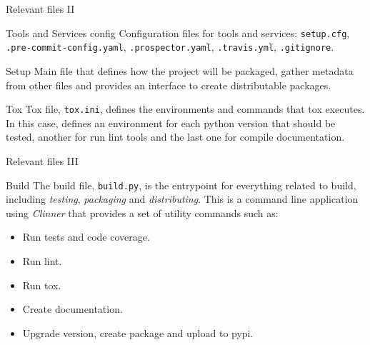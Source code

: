 \begin{frame}{Relevant files II}
    \begin{block}{Tools and Services config}
        Configuration files for tools and services: \texttt{setup.cfg}, \texttt{.pre-commit-config.yaml}, \texttt{.prospector.yaml}, \texttt{.travis.yml}, \texttt{.gitignore}.
    \end{block}
    \pause
    \begin{block}{Setup}
        Main file that defines how the project will be packaged, gather metadata from other files and provides an interface to create distributable packages.
    \end{block}
    \pause
    \begin{block}{Tox}
        Tox file, \texttt{tox.ini}, defines the environments and commands that tox executes. In this case, defines an environment for each python version that should be tested, another for run lint tools and the last one for compile documentation.
    \end{block}
\end{frame}
\begin{frame}{Relevant files III}
    \begin{block}{Build}
        The build file, \texttt{build.py}, is the entrypoint for everything related to build, including \emph{testing}, \emph{packaging} and \emph{distributing}. This is a command line application using \emph{Clinner} that provides a set of utility commands such as:
        \begin{itemize}
            \item Run tests and code coverage.
            \item Run lint.
            \item Run tox.
            \item Create documentation.
            \item Upgrade version, create package and upload to pypi.
        \end{itemize}
    \end{block}
\end{frame}
